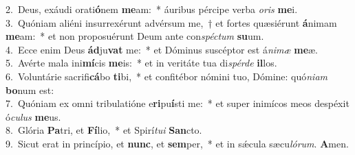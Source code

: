 {2.~}Deus, exáudi orati\textbf{ó}nem \textbf{me}am:~* áuribus pércipe verba \textit{o}\textit{ris} \textbf{me}i.\\
{3.~}Quóniam aliéni insurrexérunt advérsum me,~† et fortes quæsiérunt \textbf{á}nimam \textbf{me}am:~* et non proposuérunt Deum ante con\textit{spé}\textit{ctum} \textbf{su}um.\\
{4.~}Ecce enim Deus \textbf{ád}ju\textbf{vat} me:~* et Dóminus suscéptor est á\textit{ni}\textit{mæ} \textbf{me}æ.\\
{5.~}Avérte mala ini\textbf{mí}cis \textbf{me}is:~* et in veritáte tua di\textit{spér}\textit{de} \textbf{il}los.\\
{6.~}Voluntárie sacrifi\textbf{cá}bo \textbf{ti}bi,~* et confitébor nómini tuo, Dómine: quó\textit{ni}\textit{am} \textbf{bo}num est:\\
{7.~}Quóniam ex omni tribulatióne e\textbf{ri}pu\textbf{í}sti me:~* et super inimícos meos despéxit ó\textit{cu}\textit{lus} \textbf{me}us.\\
{8.~}Glória \textbf{Pa}tri, et \textbf{Fí}lio,~* et Spirí\textit{tu}\textit{i} \textbf{San}cto.\\
{9.~}Sicut erat in princípio, et \textbf{nunc}, et \textbf{sem}per,~* et in sǽcula sæcu\textit{ló}\textit{rum}. \textbf{A}men.\\
